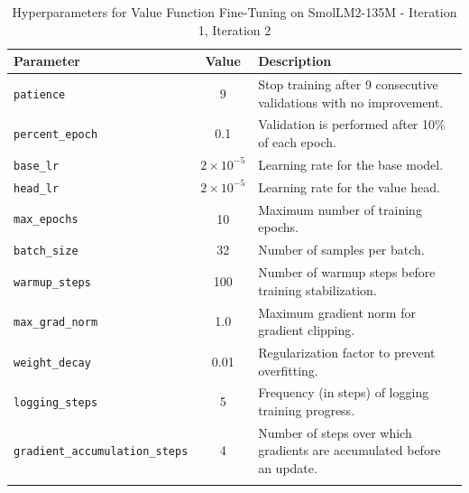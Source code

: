 \documentclass{article}
\begin{document}
\begin{table}[ht]
\centering
\begin{tabular}{@{}l c p{8cm}@{}}
\toprule
\textbf{Parameter}               & \textbf{Value}        & \textbf{Description} \\ \midrule
\texttt{patience}                & 9                     & Stop training after 9 consecutive validations with no improvement. \\[0.5em]
\texttt{percent\_epoch}          & 0.1                   & Validation is performed after 10\% of each epoch. \\[0.5em]
\texttt{base\_lr}                & $2\times10^{-5}$      & Learning rate for the base model. \\[0.5em]
\texttt{head\_lr}                & $2\times10^{-5}$      & Learning rate for the value head. \\[0.5em]
\texttt{max\_epochs}             & 10                    & Maximum number of training epochs. \\[0.5em]
\texttt{batch\_size}             & 32                    & Number of samples per batch. \\[0.5em]
\texttt{warmup\_steps}           & 100                   & Number of warmup steps before training stabilization. \\[0.5em]
\texttt{max\_grad\_norm}         & 1.0                   & Maximum gradient norm for gradient clipping. \\[0.5em]
\texttt{weight\_decay}           & 0.01                  & Regularization factor to prevent overfitting. \\[0.5em]
\texttt{logging\_steps}          & 5                     & Frequency (in steps) of logging training progress. \\[0.5em]
\texttt{gradient\_accumulation\_steps} & 4              & Number of steps over which gradients are accumulated before an update. \\[0.5em]
 \\ \bottomrule
\end{tabular}
\caption{Hyperparameters for Value Function Fine-Tuning on SmolLM2-135M - Iteration 1, Iteration 2}
\label{tab:hyperparams}
\end{table}
\end{document}
